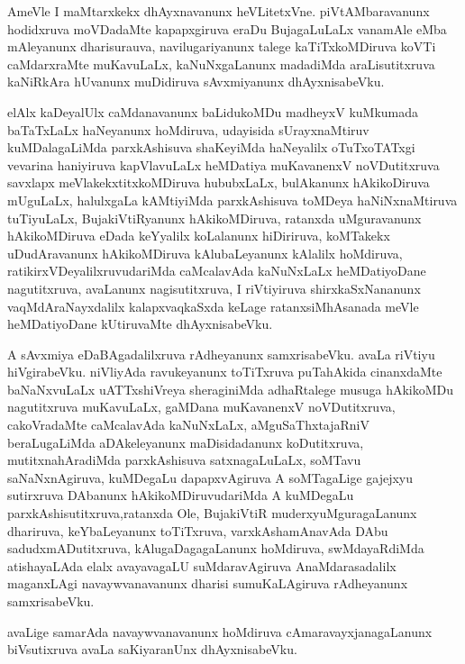 \documentclass{article}
\begin{document}
\begin{mn}%
AmeVle I maMtarxkekx dhAyxnavanunx heVLitetxVne. piVtAMbaravanunx hodidxruva moVDadaMte 
kapapxgiruva eraDu BujagaLuLaLx vanamAle eMba mAleyanunx dharisurauva, navilugariyanunx 
talege kaTiTxkoMDiruva koVTi caMdarxraMte muKavuLaLx, kaNuNxgaLanunx madadiMda 
araLisutitxruva kaNiRkAra hUvanunx muDidiruva sAvxmiyanunx dhAyxnisabeVku.
\end{mn}

\begin{mn}%
elAlx kaDeyalUlx caMdanavanunx baLidukoMDu madheyxV kuMkumada baTaTxLaLx haNeyanunx 
hoMdiruva, udayisida sUrayxnaMtiruv kuMDalagaLiMda parxkAshisuva shaKeyiMda haNeyalilx 
oTuTxoTATxgi vevarina haniyiruva kapVlavuLaLx heMDatiya muKavanenxV noVDutitxruva 
savxlapx meVlakekxtitxkoMDiruva hububxLaLx, bulAkanunx hAkikoDiruva mUguLaLx, halulxgaLa
kAMtiyiMda parxkAshisuva toMDeya haNiNxnaMtiruva tuTiyuLaLx, BujakiVtiRyanunx 
hAkikoMDiruva, ratanxda uMguravanunx hAkikoMDiruva eDada keYyalilx koLalanunx hiDiriruva, 
koMTakekx uDudAravanunx hAkikoMDiruva kAlubaLeyanunx kAlalilx hoMdiruva, 
ratikirxVDeyalilxruvudariMda caMcalavAda kaNuNxLaLx heMDatiyoDane nagutitxruva, avaLanunx 
nagisutitxruva, I riVtiyiruva shirxkaSxNananunx vaqMdAraNayxdalilx kalapxvaqkaSxda keLage 
ratanxsiMhAsanada meVle heMDatiyoDane kUtiruvaMte dhAyxnisabeVku.
\end{mn}

\begin{mn}%
A sAvxmiya eDaBAgadalilxruva rAdheyanunx samxrisabeVku. avaLa riVtiyu hiVgirabeVku. 
niVliyAda ravukeyanunx toTiTxruva puTahAkida cinanxdaMte baNaNxvuLaLx uATTxshiVreya 
sheraginiMda adhaRtalege musuga hAkikoMDu nagutitxruva muKavuLaLx, gaMDana muKavanenxV 
noVDutitxruva, cakoVradaMte caMcalavAda kaNuNxLaLx, aMguSaThxtajaRniV beraLugaLiMda 
aDAkeleyanunx maDisidadanunx koDutitxruva, mutitxnahAradiMda parxkAshisuva 
satxnagaLuLaLx, soMTavu saNaNxnAgiruva, kuMDegaLu dapapxvAgiruva A soMTagaLige gajejxyu 
sutirxruva DAbanunx hAkikoMDiruvudariMda A kuMDegaLu parxkAshisutitxruva,ratanxda Ole, 
BujakiVtiR muderxyuMguragaLanunx dhariruva, keYbaLeyanunx toTiTxruva, varxkAshamAnavAda 
DAbu sadudxmADutitxruva, kAlugaDagagaLanunx hoMdiruva, swMdayaRdiMda atishayaLAda elalx 
avayavagaLU suMdaravAgiruva AnaMdarasadalilx maganxLAgi navaywvanavanunx dharisi 
sumuKaLAgiruva rAdheyanunx samxrisabeVku.
\end{mn}

\begin{mn}%
avaLige samarAda navaywvanavanunx hoMdiruva cAmaravayxjanagaLanunx biVsutixruva avaLa 
saKiyaranUnx dhAyxnisabeVku.
\end{mn}
\end{document}
